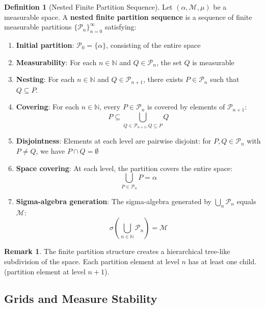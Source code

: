 \documentclass[12pt,a4paper]{article}
\theoremstyle{definition}
\newtheorem{definition}{Definition}[section]
\newtheorem{remark}{Remark}[section]
\newcommand{\Nat}{\mathbb{N}}
\begin{document}
\begin{definition}[Nested Finite Partition Sequence]
Let $(\alpha, \mathcal{M}, \mu)$ be a measurable space. A \textbf{nested finite partition sequence} is a sequence of finite measurable partitions $\{\mathcal{P}_n\}_{n=0}^{\infty}$ satisfying:

\begin{enumerate}[label=(\roman*)]
  \item \textbf{Initial partition}: $\mathcal{P}_0 = \{\alpha\}$, consisting of the entire space
  \item \textbf{Measurability}: For each $n \in \Nat$ and $Q \in \mathcal{P}_n$, the set $Q$ is measurable
  \item \textbf{Nesting}: For each $n \in \Nat$ and $Q \in \mathcal{P}_{n+1}$, there exists $P \in \mathcal{P}_n$ such that $Q \subseteq P$. 
  \item \textbf{Covering}: For each $n \in \Nat$, every $P \in \mathcal{P}_n$ is covered by elements of $\mathcal{P}_{n+1}$:
    $$P \subseteq \bigcup_{Q \in \mathcal{P}_{n+1}, Q \subseteq P} Q$$
  \item \textbf{Disjointness}: Elements at each level are pairwise disjoint: for $P, Q \in \mathcal{P}_n$ with $P \neq Q$, we have $P \cap Q = \emptyset$
  \item \textbf{Space covering}: At each level, the partition covers the entire space:
    $$\bigcup_{P \in \mathcal{P}_n} P = \alpha$$
  \item \textbf{Sigma-algebra generation}: The sigma-algebra generated by $\bigcup_n \mathcal{P}_n$ equals $\mathcal{M}$:
    $$\sigma\left(\bigcup_{n \in \Nat} \mathcal{P}_n\right) = \mathcal{M}$$
\end{enumerate}
\end{definition}

\begin{remark}
The finite partition structure creates a hierarchical tree-like subdivision of the space. Each partition element at level $n$ has at least one  child.(partition element at level $n+1$).
\end{remark}

\subsection{Grids and Measure Stability}
\end{document}
